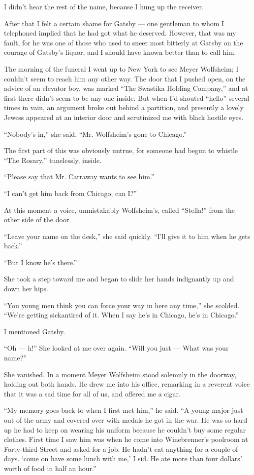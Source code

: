 \documentclass{znotebook}
\begin{document}
I didn't hear the rest of the name, because I hung up the receiver.

After that I felt a certain shame for Gatsby ---{} one gentleman to whom I telephoned implied that he had got what he deserved. However, that was my fault, for he was one of those who used to sneer most bitterly at Gatsby on the courage of Gatsby's liquor, and I should have known better than to call him.

The morning of the funeral I went up to New York to see Meyer Wolfsheim; I couldn't seem to reach him any other way. The door that I pushed open, on the advice of an elevator boy, was marked ``The Swastika Holding Company,'' and at first there didn't seem to be any one inside. But when I'd shouted ``hello'' several times in vain, an argument broke out behind a partition, and presently a lovely Jewess appeared at an interior door and scrutinized me with black hostile eyes.

``Nobody's in,'' she said. ``Mr. Wolfsheim's gone to Chicago.''

The first part of this was obviously untrue, for someone had begun to whistle ``The Rosary,'' tunelessly, inside.

``Please say that Mr. Carraway wants to see him.''

``I can't get him back from Chicago, can I?''

At this moment a voice, unmistakably Wolfsheim's, called ``Stella!'' from the other side of the door.

``Leave your name on the desk,'' she said quickly. ``I'll give it to him when he gets back.''

``But I know he's there.''

She took a step toward me and began to slide her hands indignantly up and down her hips.

``You young men think you can force your way in here any time,'' she scolded. ``We're getting sickantired of it. When I say he's in Chicago, he's in Chicago.''

I mentioned Gatsby.

``Oh ---{} h!'' She looked at me over again. ``Will you just ---{} What was your name?''

She vanished. In a moment Meyer Wolfsheim stood solemnly in the doorway, holding out both hands. He drew me into his office, remarking in a reverent voice that it was a sad time for all of us, and offered me a cigar.

``My memory goes back to when I first met him,'' he said. ``A young major just out of the army and covered over with medals he got in the war. He was so hard up he had to keep on wearing his uniform because he couldn't buy some regular clothes. First time I saw him was when he come into Winebrenner's poolroom at Forty-third Street and asked for a job. He hadn't eat anything for a couple of days. ‘come on have some lunch with me,' I sid. He ate more than four dollars' worth of food in half an hour.''
\end{document}
